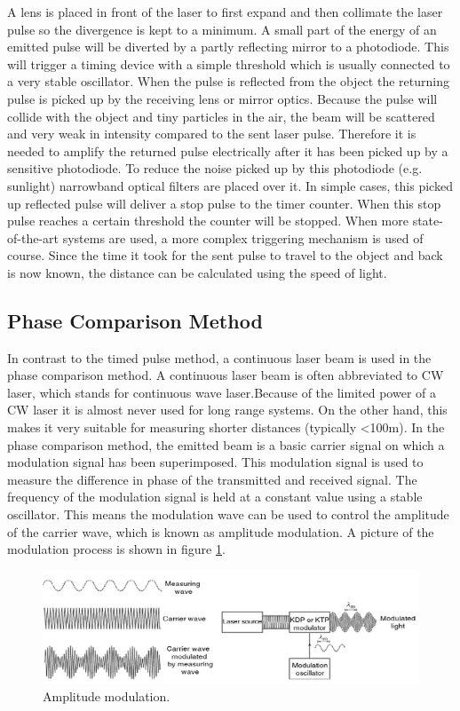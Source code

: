 \documentclass{article}
\begin{document}
A lens is placed in front of the laser to first expand and then collimate the laser pulse so the divergence is kept to a minimum. A small part of the energy of an emitted pulse will be diverted by a partly reflecting mirror to a photodiode. This will trigger a timing device with a simple threshold which is usually connected to a very stable oscillator. When the pulse is reflected from the object the returning pulse is picked up by the receiving lens or mirror optics. Because the pulse will collide with the object and tiny particles in the air, the beam will be scattered and very weak in intensity compared to the sent laser pulse. Therefore it is needed to amplify the returned pulse electrically after it has been picked up by a sensitive photodiode. To reduce the noise picked up by this photodiode (e.g. sunlight) 
narrowband optical filters are placed over it. In simple cases, this picked up reflected pulse will deliver a stop pulse to the timer counter. When this stop pulse reaches a certain threshold the counter will be stopped. When more state-of-the-art systems are used, a more complex triggering mechanism is used of course. Since the time it took for the sent pulse to travel to the object and back is now known, the distance can be calculated using the speed of light.

\subsection{Phase Comparison Method}

In contrast to the timed pulse method, a continuous laser beam is used in the phase comparison method. A continuous laser beam is often abbreviated to CW laser, which stands for continuous wave laser.Because of the limited power of a CW laser it is almost never used for long range systems. On the other hand, this makes it very suitable for measuring shorter distances (typically \textless 100m). In the phase comparison method, the emitted beam is a basic carrier signal on which a modulation signal has been superimposed. This modulation signal is used to measure the difference in phase of the transmitted and received signal. The frequency of the modulation signal is held at a constant value using a stable oscillator. This means the modulation wave can be used to control the amplitude of the carrier wave, which is known as amplitude modulation. A picture of the modulation process is shown in figure \ref{lidar2}. 


\begin{figure}[H]
	\centering
	\includegraphics[scale=1]{figures/Modulation}
	\caption{Amplitude modulation. }
	\label{lidar2}
\end{figure}
\end{document}
